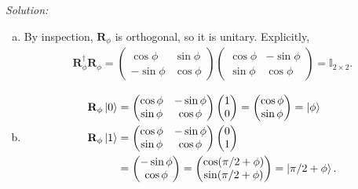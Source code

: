 \documentclass{book}
\theoremstyle{definition}
\newcommand{\nn}{\nonumber}
\newcommand{\Id}{\mathbb{I}}
\begin{document}
\noindent \textit{Solution:} 
\begin{enumerate}[(a)]
	\item By inspection, $\mathbf{R}_\phi$ is orthogonal, so it is unitary. Explicitly,
	\begin{align}
	\mathbf{R}_\phi^\dagger \mathbf{R}_\phi = 
	\begin{pmatrix}
	\cos\phi & \sin\phi \\ -\sin\phi & \cos\phi
	\end{pmatrix}
	\begin{pmatrix}
	\cos\phi & -\sin\phi \\ \sin\phi & \cos\phi
	\end{pmatrix} = \Id_{2\times 2}.
	\end{align}
	
	
	\item 
	\begin{align}
	\mathbf{R}_\phi\ket{0} &= \begin{pmatrix}
	\cos\phi & -\sin\phi \\ \sin\phi & \cos\phi
	\end{pmatrix}\begin{pmatrix}
	1\\0
	\end{pmatrix} = \begin{pmatrix}
	\cos\phi \\ \sin\phi
	\end{pmatrix} = \ket{\phi}\\
	\mathbf{R}_\phi\ket{1} &= \begin{pmatrix}
	\cos\phi & -\sin\phi \\ \sin\phi & \cos\phi
	\end{pmatrix}\begin{pmatrix}
	0\\1
	\end{pmatrix} \nn\\
	&= \begin{pmatrix}
	-\sin\phi \\ \cos\phi
	\end{pmatrix} = \begin{pmatrix}
	\cos(\pi/2+\phi) \\ \sin(\pi/2+\phi)
	\end{pmatrix} = \ket{\pi/2 + \phi}.
	\end{align}
	

\end{enumerate}
\end{document}
